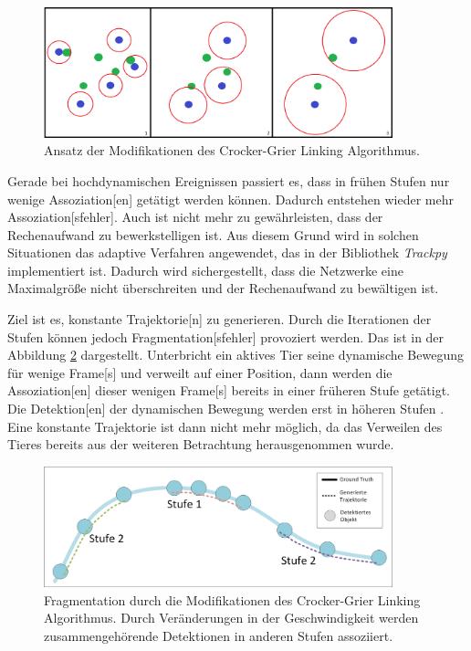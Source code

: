 \begin{figure}[htb]
    \centering
    \includegraphics[width=0.9\textwidth]{img/Grafiken/CrockGrierMod Funktionsprinzip.png}
    \caption[Ansatz der Modifikationen des Crocker-Grier Linking Algorithmus.]{Ansatz der Modifikationen des Crocker-Grier Linking Algorithmus.}
    \label{fig:funkCrockGrierMod}
\end{figure}

Gerade bei hochdynamischen Ereignissen passiert es, dass in frühen Stufen nur wenige \gls{Assoziation}[en] getätigt werden können. Dadurch entstehen wieder mehr \gls{Assoziation}[sfehler]. Auch ist nicht mehr zu gewährleisten, dass der Rechenaufwand zu bewerkstelligen ist. Aus diesem Grund wird in solchen Situationen das adaptive Verfahren angewendet, das in der \gls{Bibliothek} \textit{Trackpy} \cite{Allan.2023} implementiert ist. Dadurch wird sichergestellt, dass die Netzwerke eine Maximalgröße nicht überschreiten und der Rechenaufwand zu bewältigen ist. \par

Ziel ist es, konstante \gls{Trajektorie}[n] zu generieren. Durch die Iterationen der Stufen können jedoch \gls{Fragmentation}[sfehler] provoziert werden. Das ist in der Abbildung \ref{fig:bspCrockGrierFrag} dargestellt. Unterbricht ein aktives Tier seine dynamische Bewegung für wenige \gls{Frame}[s] und verweilt auf einer Position, dann werden die \gls{Assoziation}[en] dieser wenigen \gls{Frame}[s] bereits in einer früheren Stufe getätigt. Die \gls{Detektion}[en] der dynamischen Bewegung werden erst in höheren Stufen . Eine konstante \gls{Trajektorie} ist dann nicht mehr möglich, da das Verweilen des Tieres bereits aus der weiteren Betrachtung herausgenommen wurde. 

\begin{figure}[htb]
    \centering
    \includegraphics[width=0.9\textwidth]{img/Grafiken/Fragmentation durch Stufen.png}
    \caption[Fragmentation durch die Modifikationen des Crocker-Grier Linking Algorithmus.]{Fragmentation durch die Modifikationen des Crocker-Grier Linking Algorithmus. Durch Veränderungen in der Geschwindigkeit werden zusammengehörende Detektionen in anderen Stufen assoziiert.}
    \label{fig:bspCrockGrierFrag}
\end{figure}

